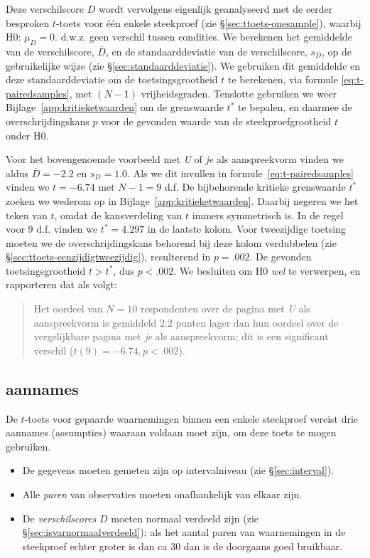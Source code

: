 \documentclass[
]{book}
\begin{document}
Deze verschilscore \(D\) wordt vervolgens eigenlijk geanalyseerd met de
eerder besproken \(t\)-toets voor één enkele steekproef (zie
§\ref{sec:ttoets-onesample}), waarbij H0: \(\mu_D=0\). d.w.z. geen verschil
tussen condities. We berekenen het gemiddelde van de verschilscore,
\(\overline{D}\), en de standaarddeviatie van de verschilscore, \(s_{D}\),
op de gebruikelijke wijze (zie
§\ref{sec:standaarddeviatie}). We gebruiken dit gemiddelde en deze
standaarddeviatie om de toetsingsgrootheid \(t\) te berekenen, via formule
\eqref{eq:t-pairedsamples}, met \((N-1)\) vrijheidsgraden. Tenslotte
gebruiken we weer
Bijlage~\ref{app:kritieketwaarden} om de grenswaarde \(t^*\) te bepalen, en
daarmee de overschrijdingskans \(p\) voor de gevonden waarde van de
steekproefgrootheid \(t\) onder H0.

Voor het bovengenoemde voorbeeld met \emph{U} of \emph{je} als aanspreekvorm
vinden we aldus \(\overline{D}=-2.2\) en \(s_D=1.0\). Als we dit invullen in
formule~\eqref{eq:t-pairedsamples} vinden we \(t=-6.74\) met \(N-1=9\) d.f. De
bijbehorende kritieke grenswaarde \(t^*\) zoeken we wederom op in
Bijlage~\ref{app:kritieketwaarden}. Daarbij negeren we het teken van \(t\),
omdat de kansverdeling van \(t\) immers symmetrisch is. In de regel voor 9
d.f. vinden we \(t^*=4.297\) in de laatste kolom. Voor tweezijdige
toetsing moeten we de overschrijdingskans behorend bij deze kolom
verdubbelen (zie
§\ref{sec:ttoets-eenzijdigtweezijdig}), resulterend in \(p=.002\).
De gevonden toetsingsgrootheid \(t > t^*\), dus \(p<.002\). We besluiten om
H0 \emph{wel} te verwerpen, en rapporteren dat als volgt:

\begin{quote}
Het oordeel van \(N=10\) respondenten over de pagina met \emph{U} als
aanspreekvorm is gemiddeld 2.2 punten lager dan hun oordeel over de
vergelijkbare pagina met \emph{je} als aanspreekvorm; dit is een
significant verschil (\(t(9)=-6.74, p<.002\)).
\end{quote}

\hypertarget{aannames-1}{%
\subsection{aannames}\label{aannames-1}}

De \(t\)-toets voor gepaarde waarnemingen binnen een enkele steekproef vereist drie
aannames (assumpties) waaraan voldaan moet zijn, om deze toets te mogen
gebruiken.

\begin{itemize}
\item
  De gegevens moeten gemeten zijn op intervalniveau (zie
  §\ref{sec:interval}).
\item
  Alle \emph{paren} van observaties moeten onafhankelijk van elkaar
  zijn.
\item
  De \emph{verschilscores} \(D\) moeten normaal verdeeld zijn (zie
  §\ref{sec:isvarnormaalverdeeld}); als het aantal paren van
  waarnemingen in de steekproef echter groter is dan ca 30 dan is de
  doorgaans goed bruikbaar.
\end{itemize}
\end{document}
